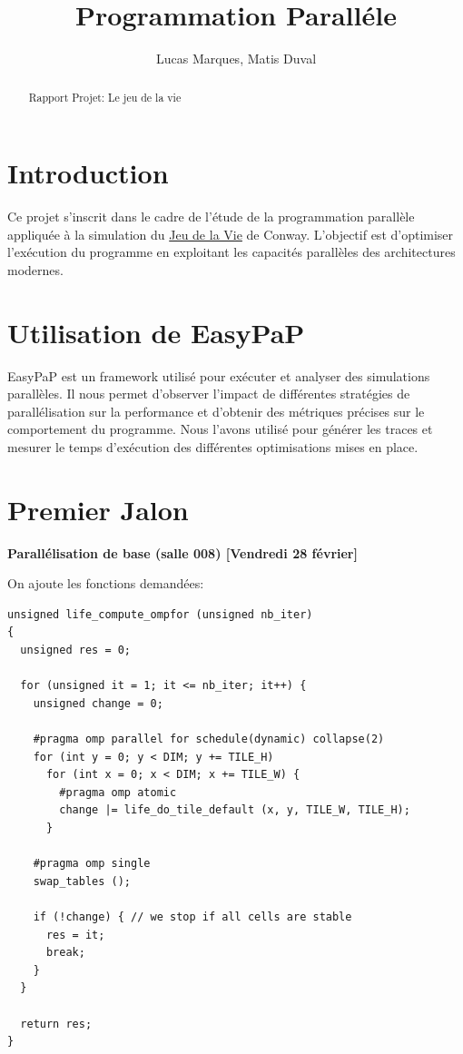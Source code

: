 \documentclass{article}
\title{Programmation Parall\'ele}
\author{Lucas Marques, Matis Duval}
\begin{document}
\maketitle

\begin{abstract}
Rapport Projet: Le jeu de la vie
\end{abstract}

\section{Introduction}
Ce projet s'inscrit dans le cadre de l'étude de la programmation parallèle appliquée à la simulation du \href{https://en.wikipedia.org/wiki/Conway%27s_Game_of_Life}{Jeu de la Vie} de Conway. L'objectif est d'optimiser l'exécution du programme en exploitant les capacités parallèles des architectures modernes.

\section{Utilisation de EasyPaP}
EasyPaP est un framework utilisé pour exécuter et analyser des simulations parallèles. Il nous permet d'observer l'impact de différentes stratégies de parallélisation sur la performance et d'obtenir des métriques précises sur le comportement du programme. Nous l'avons utilisé pour générer les traces et mesurer le temps d'exécution des différentes optimisations mises en place.

\section{Premier Jalon}

\textbf{Parall\'elisation de base (salle 008) [Vendredi 28 février]}

On ajoute les fonctions demandées:

\begin{lstlisting}
unsigned life_compute_ompfor (unsigned nb_iter)
{
  unsigned res = 0;

  for (unsigned it = 1; it <= nb_iter; it++) {
    unsigned change = 0;

    #pragma omp parallel for schedule(dynamic) collapse(2)
    for (int y = 0; y < DIM; y += TILE_H)
      for (int x = 0; x < DIM; x += TILE_W) {
        #pragma omp atomic
        change |= life_do_tile_default (x, y, TILE_W, TILE_H);
      }

    #pragma omp single
    swap_tables ();

    if (!change) { // we stop if all cells are stable
      res = it;
      break;
    }
  }

  return res;
}
\end{lstlisting}
\end{document}
